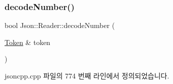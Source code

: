 \subsubsection{\texorpdfstring{decode\+Number()}{decodeNumber()}\hspace{0.1cm}{\footnotesize\ttfamily [1/2]}}
{\footnotesize\ttfamily bool Json\+::\+Reader\+::decode\+Number (\begin{DoxyParamCaption}\item[{\hyperlink{class_json_1_1_reader_1_1_token}{Token} \&}]{token }\end{DoxyParamCaption})\hspace{0.3cm}{\ttfamily [private]}}



jsoncpp.\+cpp 파일의 774 번째 라인에서 정의되었습니다.


